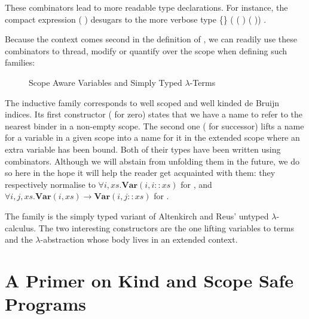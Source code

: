 These combinators lead to more readable type declarations. For instance,
the compact expression
\AF{[}   (  )   \AF{]}
desugars to the more verbose type
 \{\}  ( ( )   ( ))   .

Because the context comes second in the definition of , we
can readily use these combinators to thread, modify or quantify over the
scope when defining such families:

\begin{figure}[h]
\begin{minipage}{0.40\textwidth}
\end{minipage}
\begin{minipage}{0.5\textwidth}
\end{minipage}
\caption{Scope Aware Variables and Simply Typed $\lambda$-Terms\label{scoped-untyped}}
\end{figure}

The inductive family  corresponds to well scoped and well kinded
de Bruijn~\citeyear{de1972lambda}
indices. Its first constructor ( for zero) states that we have a name to refer to
the nearest binder in a non-empty scope. The second one ( for successor) lifts a
name for a variable in a given scope into a name for it in the extended scope where
an extra variable has been bound. Both of their types have been written using combinators.
Although we will abstain from unfolding them in the future, we do so here in the hope
it will help the reader get acquainted with them: they respectively normalise to
$\forall i, xs. \mathbf{Var}(i, i :\!: \mathit{xs})$ for ,
and $\forall i, j, xs. \mathbf{Var}(i, \mathit{xs}) \rightarrow \mathbf{Var}(i, j :\!: \mathit{xs})$ for .

The   family  is the simply typed variant of Altenkirch
and Reus' untyped $\lambda$-calculus. The two interesting constructors are the one
lifting variables to terms and the $\lambda$-abstraction whose body lives in an
extended context.




\section{A Primer on Kind and Scope Safe Programs}\label{section:primer-program}

